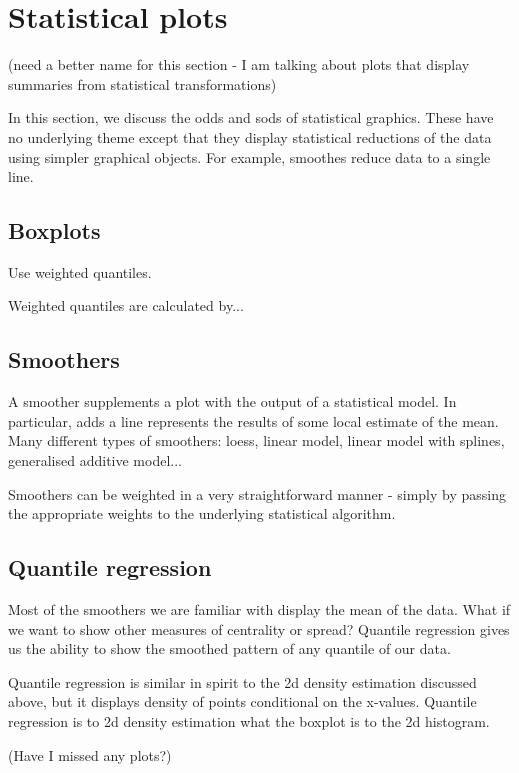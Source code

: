 \documentclass[oneside,letterpaper]{scrartcl}
\begin{document}
\section{Statistical plots}\label{sec:statistical_plots}

(need a better name for this section - I am talking about plots that display summaries from statistical transformations)

In this section, we discuss the odds and sods of statistical graphics.  These have no underlying theme except that they display statistical reductions of the data using simpler graphical objects.  For example, smoothes reduce data to a single line.

\subsection{Boxplots}\label{sub:boxplots}

Use weighted quantiles.

Weighted quantiles are calculated by...

\subsection{Smoothers}\label{sub:smoothers}

A smoother supplements a plot with the output of a statistical model.  In particular, adds a line represents the results of some local estimate of the mean.  Many different types of smoothers: loess, linear model, linear model with splines, generalised additive model...

Smoothers can be weighted in a very straightforward manner - simply by passing the appropriate weights to the underlying statistical algorithm.

\subsection{Quantile regression}\label{sub:quantile_regression}

Most of the smoothers we are familiar with display the mean of the data.  What if we want to show other measures of centrality or spread?  Quantile regression gives us the ability to show the smoothed pattern of any quantile of our data.

Quantile regression is similar in spirit to the 2d density estimation discussed above, but it displays density of points conditional on the x-values.  Quantile regression is to 2d density estimation what the boxplot is to the 2d histogram.

(Have I missed any plots?)
\end{document}
